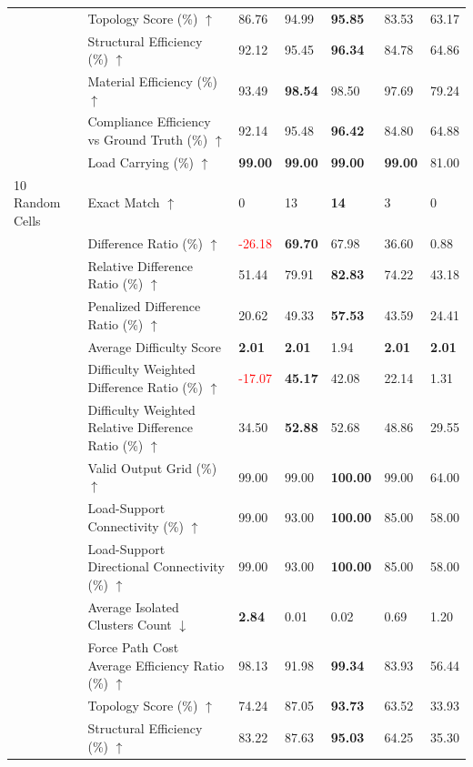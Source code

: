 \begin{table}[!h]
{\begin{tabular}{lllllll}
 & Topology Score (\%) $\uparrow$ & 86.76 & 94.99 & \textbf{95.85} & 83.53 & 63.17 \\
 & Structural Efficiency (\%) $\uparrow$ & 92.12 & 95.45 & \textbf{96.34} & 84.78 & 64.86 \\
 & Material Efficiency (\%) $\uparrow$ & 93.49 & \textbf{98.54} & 98.50 & 97.69 & 79.24 \\
 & Compliance Efficiency vs Ground Truth (\%) $\uparrow$ & 92.14 & 95.48 & \textbf{96.42} & 84.80 & 64.88 \\
 & Load Carrying (\%) $\uparrow$ & \textbf{99.00} & \textbf{99.00} & \textbf{99.00} & \textbf{99.00} & 81.00 \\
10 Random Cells & Exact Match $\uparrow$ & 0 & 13 & \textbf{14} & 3 & 0 \\
 & Difference Ratio (\%) $\uparrow$ & \textcolor{red}{-26.18} & \textbf{69.70} & 67.98 & 36.60 & 0.88 \\
 & Relative Difference Ratio (\%) $\uparrow$ & 51.44 & 79.91 & \textbf{82.83} & 74.22 & 43.18 \\
 & Penalized Difference Ratio (\%) $\uparrow$ & 20.62 & 49.33 & \textbf{57.53} & 43.59 & 24.41 \\
 & Average Difficulty Score & \textbf{2.01} & \textbf{2.01} & 1.94 & \textbf{2.01} & \textbf{2.01} \\
 & Difficulty Weighted Difference Ratio (\%) $\uparrow$ & \textcolor{red}{-17.07} & \textbf{45.17} & 42.08 & 22.14 & 1.31 \\
 & Difficulty Weighted Relative Difference Ratio (\%) $\uparrow$ & 34.50 & \textbf{52.88} & 52.68 & 48.86 & 29.55 \\
 & Valid Output Grid (\%) $\uparrow$ & 99.00 & 99.00 & \textbf{100.00} & 99.00 & 64.00 \\
 & Load-Support Connectivity (\%) $\uparrow$ & 99.00 & 93.00 & \textbf{100.00} & 85.00 & 58.00 \\
 & Load-Support Directional Connectivity (\%) $\uparrow$ & 99.00 & 93.00 & \textbf{100.00} & 85.00 & 58.00 \\
 & Average Isolated Clusters Count $\downarrow$ & \textbf{2.84} & 0.01 & 0.02 & 0.69 & 1.20 \\
 & Force Path Cost Average Efficiency Ratio (\%) $\uparrow$ & 98.13 & 91.98 & \textbf{99.34} & 83.93 & 56.44 \\
 & Topology Score (\%) $\uparrow$ & 74.24 & 87.05 & \textbf{93.73} & 63.52 & 33.93 \\
 & Structural Efficiency (\%) $\uparrow$ & 83.22 & 87.63 & \textbf{95.03} & 64.25 & 35.30 \\

\end{tabular}}
\end{table}
